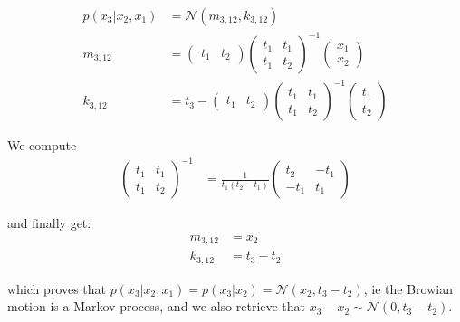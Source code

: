 \begin{align}
    p(x_3 \vert x_2, x_1) &= \mathcal{N}(m_{3,12}, k_{3,12}) \\
    m_{3,12} &= \begin{pmatrix}
        t_1 & t_2
    \end{pmatrix}
    \begin{pmatrix}
        t_1 & t_1 \\
        t_1 & t_2
    \end{pmatrix}^{-1}
    \begin{pmatrix}
        x_1 \\ x_2
    \end{pmatrix} \\
    k_{3,12} &= t_3 - \begin{pmatrix}
        t_1 & t_2
    \end{pmatrix}
    \begin{pmatrix}
        t_1 & t_1 \\
        t_1 & t_2
    \end{pmatrix}^{-1}
    \begin{pmatrix}
        t_1 \\ t_2
    \end{pmatrix}
\end{align}

We compute
\begin{align}
    \begin{pmatrix}
        t_1 & t_1 \\
        t_1 & t_2
    \end{pmatrix}^{-1} &= \frac{1}{t_1(t_2 - t_1)}
    \begin{pmatrix}
        t_2 & -t_1 \\
        -t_1 & t_1
    \end{pmatrix}
\end{align}

and finally get:
\begin{align}
    m_{3,12} &= x_2 \\
    k_{3,12} &= t_3 - t_2
\end{align}

which proves that $p(x_3 \vert x_2, x_1) = p(x_3 \vert x_2) = \mathcal{N}(x_2, t_3-t_2)$, ie the Browian motion is a Markov process,
and we also retrieve that $x_3 - x_2 \sim \mathcal{N}(0, t_3-t_2)$.